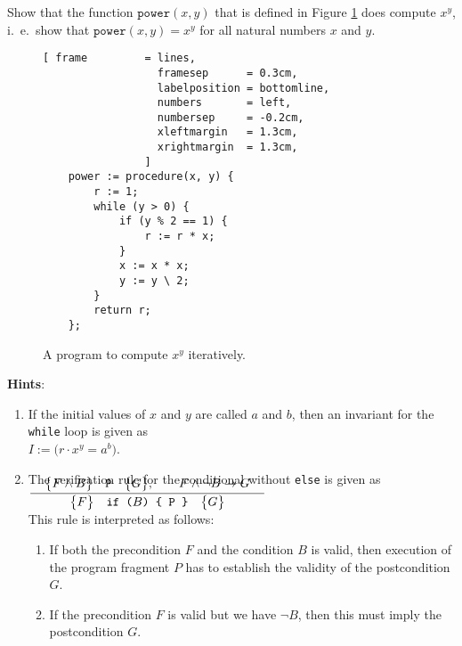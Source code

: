 \exercise
Show that the function $\texttt{power}(x,y)$ that is defined in Figure
\ref{fig:power-iterative.stlx} does compute $x^y$, i.~e.~show that $\texttt{power}(x,y) = x^y$ 
for all natural numbers $x$ and $y$.


\begin{figure}[!h]
\centering
\begin{Verbatim}[ frame         = lines, 
                  framesep      = 0.3cm, 
                  labelposition = bottomline,
                  numbers       = left,
                  numbersep     = -0.2cm,
                  xleftmargin   = 1.3cm,
                  xrightmargin  = 1.3cm,
                ]
    power := procedure(x, y) {
        r := 1;
        while (y > 0) {
            if (y % 2 == 1) {
                r := r * x;
            }
            x := x * x;
            y := y \ 2;
        }
        return r;
    };
\end{Verbatim}
\vspace*{-0.3cm}
\caption{A program to compute $x^y$ iteratively.}
\label{fig:power-iterative.stlx}
\end{figure}


\noindent
\textbf{Hints}: 
\begin{enumerate}
\item If the initial values of $x$ and $y$ are called $a$ and $b$,
      then an invariant for the \texttt{while} loop is given as 
      \\[0.2cm]
      \hspace*{1.3cm}
      $I := \bigl(r \cdot x^y = a^b\bigr)$.
\item The verification rule for the conditional without \texttt{else} is given as
      \\[0.4cm]
      \hspace*{1.3cm}
      $\bruch{\quad\hoare{F \wedge B}{P}{G}, \qquad F \wedge \neg B \rightarrow G\quad}{
                     \hoare{F}{if ($B$) \{ P \}}{G}}
      $
      \\[0.2cm]
      This rule is interpreted as follows:
      \begin{enumerate}
      \item If both the precondition $F$ and the condition $B$ is valid, then execution of the
            program fragment $P$ has to establish the validity of the postcondition $G$.
      \item If the precondition $F$ is valid but we have $\neg B$, then this must imply the postcondition
            $G$.
      \end{enumerate}
\end{enumerate}

